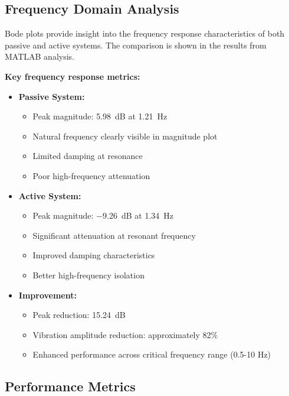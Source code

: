 \documentclass[12pt,a4paper]{article}
\begin{document}
\subsection{Frequency Domain Analysis}

Bode plots provide insight into the frequency response characteristics of both passive and active systems. The comparison is shown in the results from MATLAB analysis.

\textbf{Key frequency response metrics:}

\begin{itemize}
    \item \textbf{Passive System:}
    \begin{itemize}
        \item Peak magnitude: \SI{5.98}{dB} at \SI{1.21}{Hz}
        \item Natural frequency clearly visible in magnitude plot
        \item Limited damping at resonance
        \item Poor high-frequency attenuation
    \end{itemize}
    
    \item \textbf{Active System:}
    \begin{itemize}
        \item Peak magnitude: \SI{-9.26}{dB} at \SI{1.34}{Hz}
        \item Significant attenuation at resonant frequency
        \item Improved damping characteristics
        \item Better high-frequency isolation
    \end{itemize}
    
    \item \textbf{Improvement:}
    \begin{itemize}
        \item Peak reduction: \SI{15.24}{dB}
        \item Vibration amplitude reduction: approximately 82\%
        \item Enhanced performance across critical frequency range (0.5-10 Hz)
    \end{itemize}
\end{itemize}

\subsection{Performance Metrics}
\end{document}
